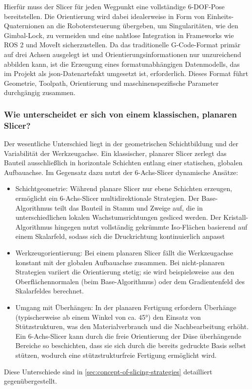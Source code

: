         Hierfür muss der Slicer für jeden Wegpunkt eine vollständige 6-\ac{DOF}-Pose bereitstellen.
        Die Orientierung wird dabei idealerweise in Form von Einheits-Quaternionen an die Robotersteuerung übergeben, um Singularitäten, wie den Gimbal-Lock, zu vermeiden und eine nahtlose Integration in Frameworks wie ROS 2 und MoveIt sicherzustellen.
        Da das traditionelle G-Code-Format primär auf drei Achsen ausgelegt ist und Orientierungsinformationen nur unzureichend abbilden kann, ist die Erzeugung eines formatunabhängigen Datenmodells, das im Projekt als \gls{json}-Datenartefakt umgesetzt ist, erforderlich.
        Dieses Format führt Geometrie, Toolpath, Orientierung und maschinenspezifische Parameter durchgängig zusammen.

      \subsubsection{Wie unterscheidet er sich von einem klassischen, planaren Slicer?}
        Der wesentliche Unterschied liegt in der geometrischen Schichtbildung und der Variabilität der Werkzeugachse.
        Ein klassischer, planarer Slicer zerlegt das Bauteil ausschließlich in horizontale Schichten entlang einer statischen, globalen Aufbauachse.
        Im Gegensatz dazu nutzt der 6-Achs-Slicer dynamische Ansätze:
        \begin{itemize}
        \item Schichtgeometrie: Während planare Slicer nur ebene Schichten erzeugen, ermöglicht ein 6-Achs-Slicer multidirektionale Strategien.
        Der Base-Algorithmus teilt das Bauteil in Stamm und Zweige auf, die in unterschiedlichen lokalen Wachstumsrichtungen gesliced werden.
        Der Kristall-Algorithmus hingegen nutzt vollständig gekrümmte Iso-Flächen basierend auf einem Skalarfeld, sodass sich die Druckrichtung kontinuierlich anpasst
        \item Werkzeugorientierung: Bei einem planaren Slicer fällt die Werkzeugachse konstant mit der globalen Aufbauachse zusammen.
        Bei nicht-planaren Strategien variiert die Orientierung stetig; sie wird beispielsweise aus den Oberflächennormalen (beim Base-Algorithmus) oder dem Gradientenfeld des Skalarfeldes berechnet.
        \item Umgang mit Überhängen: In der planaren Fertigung erfordern Überhänge (typischerweise ab einem Winkel von ca.
        45°) den Einsatz von Stützstrukturen, was den Materialverbrauch und die Nachbearbeitung erhöht.
        Ein 6-Achs-Slicer kann durch die freie Orientierung der Düse überhängende Bereiche so beschichten, dass sie sich durch die bereits gedruckte Basis selbst stützen, wodurch eine stützstrukturfreie Fertigung ermöglicht wird.
        \end{itemize}
        Diese Unterschiede sind in \ref{sec:concept-of-slicing-strategies} detailliert gegenübergestellt.


